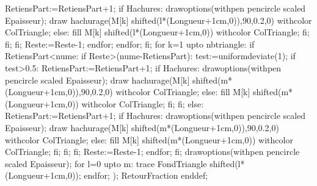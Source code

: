 {                RetiensPart:=RetiensPart+1;
                if Hachures:
                  drawoptions(withpen pencircle scaled Epaisseur);
                  draw hachurage(M[k] shifted(l*(Longueur+1cm,0)),90,0.2,0) withcolor ColTriangle;
                else:
                  fill M[k] shifted(l*(Longueur+1cm,0)) withcolor ColTriangle;
                fi;
              fi;
            fi;
            Reste:=Reste-1;
          endfor;
        endfor;  
      fi;
      for k=1 upto nbtriangle:
        if RetiensPart<nume:
          if Reste>(nume-RetiensPart):
            test:=uniformdeviate(1);
            if test>0.5:
              RetiensPart:=RetiensPart+1;
              if Hachures:
                drawoptions(withpen pencircle scaled Epaisseur);
                draw hachurage(M[k] shifted(m*(Longueur+1cm,0)),90,0.2,0) withcolor ColTriangle;
              else:
                fill M[k] shifted(m*(Longueur+1cm,0)) withcolor ColTriangle;
              fi;
            fi;
          else:
            RetiensPart:=RetiensPart+1;
            if Hachures:
              drawoptions(withpen pencircle scaled Epaisseur);
              draw hachurage(M[k] shifted(m*(Longueur+1cm,0)),90,0.2,0) withcolor ColTriangle;
            else:
              fill M[k] shifted(m*(Longueur+1cm,0)) withcolor ColTriangle;
            fi;
          fi;
        fi;
        Reste:=Reste-1;  
      endfor;
    fi;
    drawoptions(withpen pencircle scaled Epaisseur);
    for l=0 upto m:
      trace FondTriangle shifted(l*(Longueur+1cm,0));
    endfor;
  );
  RetourFraction
enddef;
}%

